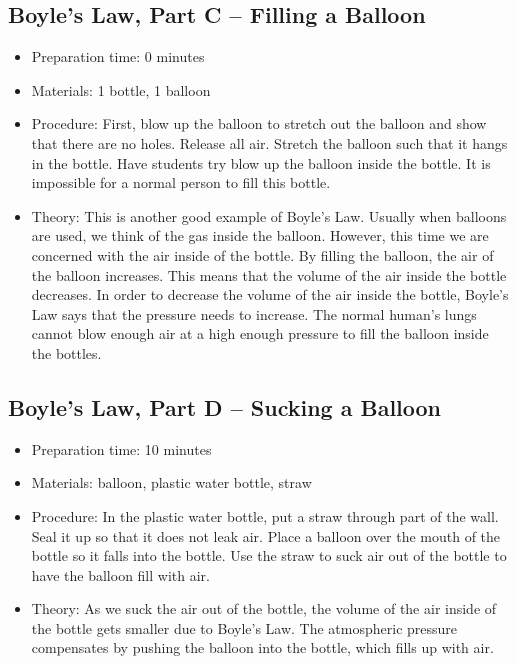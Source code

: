 \subsection{Boyle's Law, Part C -- Filling a Balloon}
\begin{itemize}
\item{Preparation time: 0 minutes}
\item{Materials: 1 bottle, 1 balloon}
\item{Procedure: First, blow up the balloon to stretch out the balloon and show that there are no holes. Release all air. Stretch the balloon such that it hangs in the bottle. Have students try blow up the balloon inside the bottle. It is impossible for a normal person to fill this bottle.}
\item{Theory: This is another good example of Boyle’s Law. Usually when balloons are used, we think of the gas inside the balloon. However, this time we are concerned with the air inside of the bottle. By filling the balloon, the air of the balloon increases. This means that the volume of the air inside the bottle decreases. In order to decrease the volume of the air inside the bottle, Boyle’s Law says that the pressure needs to increase. The normal human’s lungs cannot blow enough air at a high enough pressure to fill the balloon inside the bottles. }
\end{itemize}

\subsection{Boyle's Law, Part D -- Sucking a Balloon}
\begin{itemize}
\item{Preparation time: 10 minutes}
\item{Materials: balloon, plastic water bottle, straw}
\item{Procedure: In the plastic water bottle, put a straw through part of the wall. Seal it up so that it does not leak air. Place a balloon over the mouth of the bottle so it falls into the bottle. Use the straw to suck air out of the bottle to have the balloon fill with air.}
\item{Theory: As we suck the air out of the bottle, the volume of the air inside of the bottle gets smaller due to Boyle’s Law. The atmospheric pressure compensates by pushing the balloon into the bottle, which fills up with air.}
\end{itemize}

